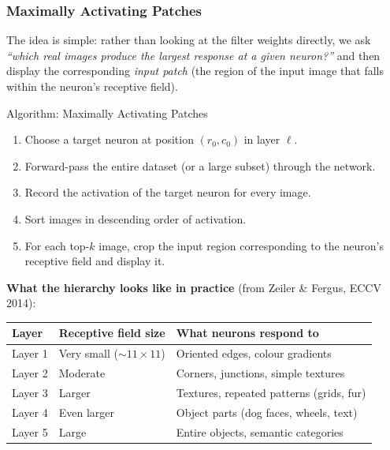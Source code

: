 \documentclass[11pt,a4paper]{article}
\begin{document}
\subsubsection{Maximally Activating Patches}

The idea is simple: rather than looking at the filter weights directly, we ask \emph{``which real images produce the largest response at a given neuron?''} and then display the corresponding \emph{input patch} (the region of the input image that falls within the neuron's receptive field).

\begin{algobox}{Algorithm: Maximally Activating Patches}
\begin{enumerate}
  \item Choose a target neuron at position $(r_0, c_0)$ in layer $\ell$.
  \item Forward-pass the entire dataset (or a large subset) through the network.
  \item Record the activation of the target neuron for every image.
  \item Sort images in descending order of activation.
  \item For each top-$k$ image, crop the input region corresponding to the neuron's receptive field and display it.
\end{enumerate}
\end{algobox}

\textbf{What the hierarchy looks like in practice} (from Zeiler \& Fergus, ECCV 2014):
\begin{center}
\renewcommand{\arraystretch}{1.25}
\begin{tabular}{@{}lll@{}}
\toprule
\textbf{Layer} & \textbf{Receptive field size} & \textbf{What neurons respond to} \\
\midrule
Layer 1 & Very small ($\sim11\times11$) & Oriented edges, colour gradients \\
Layer 2 & Moderate & Corners, junctions, simple textures \\
Layer 3 & Larger & Textures, repeated patterns (grids, fur) \\
Layer 4 & Even larger & Object parts (dog faces, wheels, text) \\
Layer 5 & Large & Entire objects, semantic categories \\
\bottomrule
\end{tabular}
\end{center}
\end{document}
